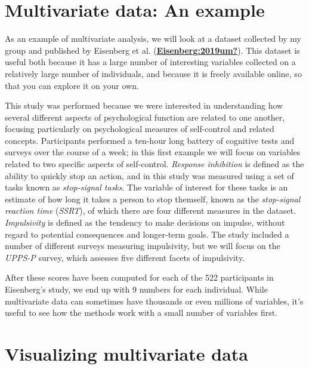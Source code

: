 \documentclass[
  12pt,
]{book}
\begin{document}
\hypertarget{multivariate-data-an-example}{%
\section{Multivariate data: An example}\label{multivariate-data-an-example}}

As an example of multivariate analysis, we will look at a dataset collected by my group and published by Eisenberg et al. (\protect\hyperlink{ref-Eisenberg:2019um}{\textbf{Eisenberg:2019um?}}). This dataset is useful both because it has a large number of interesting variables collected on a relatively large number of individuals, and because it is freely available online, so that you can explore it on your own.

This study was performed because we were interested in understanding how several different aspects of psychological function are related to one another, focusing particularly on psychological measures of self-control and related concepts. Participants performed a ten-hour long battery of cognitive tests and surveys over the course of a week; in this first example we will focus on variables related to two specific aspects of self-control. \emph{Response inhibition} is defined as the ability to quickly stop an action, and in this study was measured using a set of tasks known as \emph{stop-signal tasks}. The variable of interest for these tasks is an estimate of how long it takes a person to stop themself, known as the \emph{stop-signal reaction time} (\emph{SSRT}), of which there are four different measures in the dataset. \emph{Impulsivity} is defined as the tendency to make decisions on impulse, without regard to potential consequences and longer-term goals. The study included a number of different surveys measuring impulsivity, but we will focus on the \emph{UPPS-P} survey, which assesses five different facets of impulsivity.

After these scores have been computed for each of the 522 participants in Eisenberg's study, we end up with 9 numbers for each individual. While multivariate data can sometimes have thousands or even millions of variables, it's useful to see how the methods work with a small number of variables first.

\hypertarget{visualizing-multivariate-data}{%
\section{Visualizing multivariate data}\label{visualizing-multivariate-data}}
\end{document}

